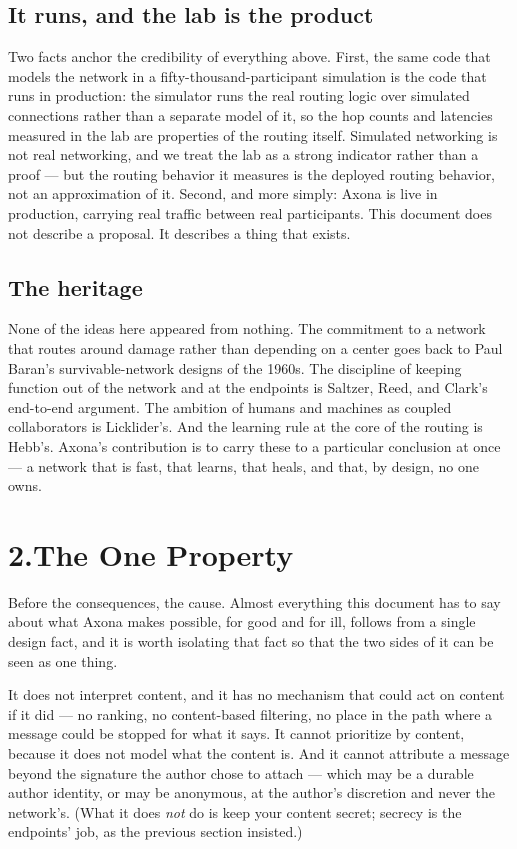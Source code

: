 \documentclass[nobib,justified]{tufte-handout}
\begin{document}
\subsection{It runs, and the lab is the product}

Two facts anchor the credibility of everything above. First, the same code that
models the network in a fifty-thousand-participant simulation is the code that
runs in production: the simulator runs the real routing logic over simulated
connections rather than a separate model of it, so the hop counts and latencies
measured in the lab are properties of the routing itself. Simulated networking
is not real networking, and we treat the lab as a strong indicator rather than a
proof --- but the routing behavior it measures is the deployed routing behavior,
not an approximation of it. Second, and more simply: Axona is live in production, carrying
real traffic between real participants. This
document does not describe a proposal. It describes a thing that exists.

\subsection{The heritage}

None of the ideas here appeared from nothing. The commitment to a network that
routes around damage rather than depending on a center goes back to Paul Baran's
survivable-network designs of the 1960s. The discipline of keeping function out
of the network and at the endpoints is Saltzer, Reed, and Clark's end-to-end
argument. The ambition of humans and machines as coupled collaborators is
Licklider's. And the learning rule at the core of the routing is Hebb's. Axona's
contribution is to carry these to a particular conclusion at once --- a network
that is fast, that learns, that heals, and that, by design, no one owns.

\section{2.\quad The One Property}

Before the consequences, the cause. Almost everything this document has to say
about what Axona makes possible, for good and for ill, follows from a single
design fact, and it is worth isolating that fact so that the two sides of it can
be seen as one thing.

 It does not interpret content, and it has no
mechanism that could act on content if it did --- no ranking, no content-based
filtering, no place in the path where a message could be stopped for what it
says. It cannot prioritize by content, because it does not model what the
content is. And it cannot attribute a message beyond the signature the author
chose to attach --- which may be a durable author identity, or may be anonymous,
at the author's discretion and never the network's. (What it does \emph{not} do
is keep your content secret; secrecy is the endpoints' job, as the previous
section insisted.)
\end{document}
